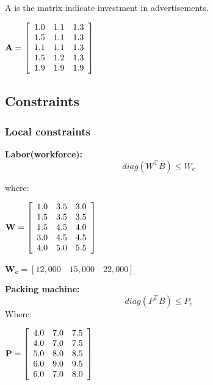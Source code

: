 \documentclass[12pt]{article}
\begin{document}
\noindent
A is the matrix indicate investment in advertisements.
\begin{center}
$\mathbf{A} = 
\left[
\begin{array}{l c r}
1.0 & 1.1 & 1.3 \\
1.5 & 1.1 & 1.3 \\
1.1 & 1.1 & 1.3 \\
1.5 & 1.2 & 1.3 \\
1.9 & 1.9 & 1.9 
\end{array}
\right]
$
\end{center}

\noindent 

\subsection{Constraints}
\subsubsection{Local constraints}
\noindent
\textbf{Labor(workforce):}
\begin{equation}
diag(W^\mathrm{T}B)\leq W_c
\end{equation}

\noindent
where:\\
\begin{center}
$\mathbf{W} = 
\left[
\begin{array}{l c r}
1.0 & 3.5 & 3.0 \\
1.5 & 3.5 & 3.5 \\
1.5 & 4.5 & 4.0 \\
3.0 & 4.5 & 4.5 \\
4.0 & 5.0 & 5.5
\end{array}
\right]
$
\end{center}

\begin{center}
$\mathbf{W_c} = 
\left[
12,000\quad  15,000\quad  22,000
\right]
$
\end{center}

\noindent
\textbf{Packing machine:}
\begin{equation}
diag(P^\mathrm{T}B)\leq P_c
\end{equation}
Where:
\begin{center}
$\mathbf{P} = 
\left[
\begin{array}{l c r}
4.0 & 7.0 & 7.5 \\
4.0 & 7.0 & 7.5 \\
5.0 & 8.0 & 8.5 \\
6.0 & 9.0 & 9.5 \\
6.0 & 7.0 & 8.0
\end{array}
\right]
$
\end{center}
\end{document}
